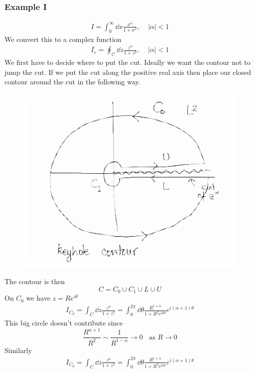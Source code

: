 \documentclass[a4paper,12pt]{article}
\begin{document}
\subsubsection{Example I}
\begin{equation}
\begin{aligned}
I=\int_{0}^{\infty}\dd x \frac{x^\alpha}{1+x^2},~~~~~|\alpha|<1
\end{aligned}
\end{equation}
We convert this to a complex function
\begin{equation}
	\begin{aligned}
		I_c=\oint_{C}\dd z \frac{z^\alpha}{1+z^2},~~~~~|\alpha|<1
	\end{aligned}
\end{equation}
We first have to decide where to put the cut. Ideally we want the contour not to jump the cut. If we put the cut along the positive real axis then place our closed contour around the cut in the following way.
\begin{figure}[H]
	\centering
	\includegraphics[width=0.7\linewidth]{16}
	\caption{}
	\label{fig:4}
\end{figure}
The contour is then
\begin{equation}
C=C_0\cup C_1\cup L\cup U
\end{equation}
On $C_0$ we have $z=Re^{i\theta}$
\begin{equation}
\begin{aligned}
	I_{C_0}=\int_{C}\dd z \frac{z^\alpha}{1+z^2}=\int_{0}^{2\pi}\dd \theta \frac{R^{1+\alpha}}{1+R^2e^{2i\theta}}e^{i(\alpha+1)\theta }
\end{aligned}
\end{equation}
This big circle doesn't contribute since
\begin{equation}
\frac{R^{\alpha+1}}{R^2}\sim \frac{1}{R^{1-\alpha}}\to 0~~~~\text{as }R\to 0 
\end{equation}
Similarly
\begin{equation}
	\begin{aligned}
		I_{C_0}=\int_{C}\dd z \frac{z^\alpha}{1+z^2}=\int_{0}^{2\pi}\dd \theta \frac{R^{1+\alpha}}{1+R^2e^{2i\theta}}e^{i(\alpha+1)\theta }
	\end{aligned}
\end{equation}
\end{document}
